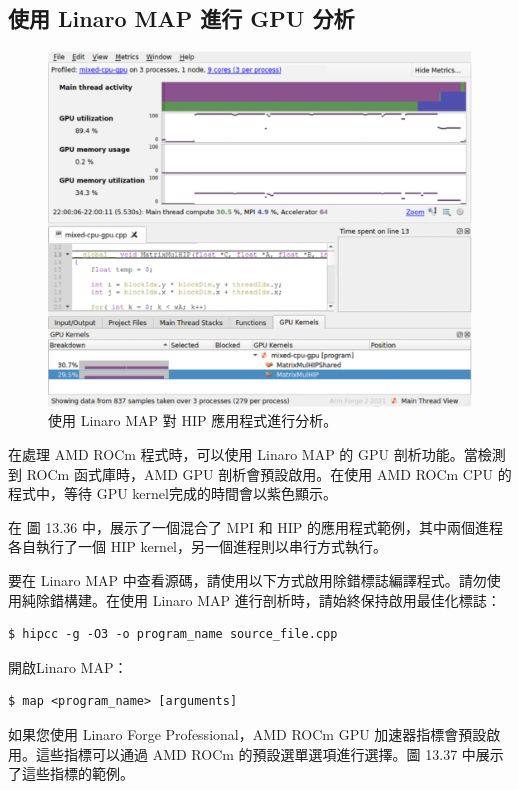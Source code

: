 \subsection{使用 Linaro MAP 進行 GPU 分析}

\begin{figure}
    \centering
    \includegraphics[width=0.9\linewidth]{FileAusiliari/Screenshots/Figure13-36.png}
    \caption{使用 Linaro MAP 對 HIP 應用程式進行分析。}
    \label{fig:PAPI36}
\end{figure}

在處理 AMD ROCm 程式時，可以使用 Linaro MAP 的 GPU 剖析功能。當檢測到 ROCm 函式庫時，AMD GPU 剖析會預設啟用。在使用 AMD ROCm CPU 的程式中，等待 GPU kernel完成的時間會以紫色顯示。

在 圖 13.36 中，展示了一個混合了 MPI 和 HIP 的應用程式範例，其中兩個進程各自執行了一個 HIP kernel，另一個進程則以串行方式執行。

要在 Linaro MAP 中查看源碼，請使用以下方式啟用除錯標誌編譯程式。請勿使用純除錯構建。在使用 Linaro MAP 進行剖析時，請始終保持啟用最佳化標誌：

\begin{lstlisting}
$ hipcc -g -O3 -o program_name source_file.cpp
\end{lstlisting}

開啟Linaro MAP：
\begin{lstlisting}
$ map <program_name> [arguments]
\end{lstlisting}

如果您使用 Linaro Forge Professional，AMD ROCm GPU 加速器指標會預設啟用。這些指標可以通過 AMD ROCm 的預設選單選項進行選擇。圖 13.37 中展示了這些指標的範例。

